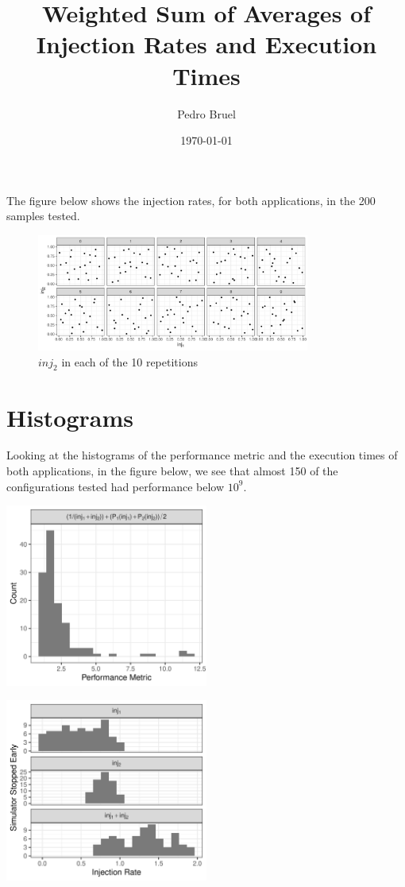 \documentclass[a4paper]{article}
\author{Pedro Bruel}
\date{\today}
\title{Weighted Sum of Averages of Injection Rates and Execution Times}
\begin{document}
\maketitle
The figure  below shows the injection  rates, for both applications,  in the 200
samples tested.

\begin{figure}[htbp]
\centering
\includegraphics[width=0.8\textwidth]{./img/2_apps_min_mean_time/rs_20_samples_10_iterations_weighted_full_scatter.pdf}
\caption{\(inj_2\) in each of the 10 repetitions}
\end{figure}

\section{Histograms}
\label{sec:org12d167d}
Looking at the  histograms of the performance metric and  the execution times of
both  applications,  in  the  figure  below,  we see  that  almost  150  of  the
configurations tested had performance below \(10^{9}\).

\begin{center}
\includegraphics[width=0.5\textwidth]{./img/2_apps_min_mean_time/rs_20_samples_10_iterations_histogram_weighted_full.pdf}
\end{center}

\begin{center}
\includegraphics[width=0.5\textwidth]{./img/2_apps_min_mean_time/rs_20_samples_10_iterations_histogram_failed_weighted_full.pdf}
\end{center}
\end{document}
